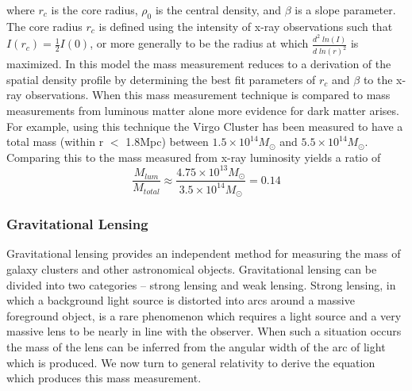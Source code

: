 \documentclass[a4paper,12pt]{article}
\begin{document}
where $r_c$ is the core radius, $\rho_0$ is the central density, and $\beta$ is a slope parameter.  \cite{Vikhlinin}  The core radius $r_c$ is defined using the intensity of x-ray observations such that $I(r_c)=\frac{1}{2}I(0)$, or more generally to be the radius at which $\frac{d^2 \; ln(I)}{d \; ln(r)^2}$ is maximized. In this model the mass measurement reduces to a derivation of the spatial density profile by determining the best fit parameters of $r_c$ and $\beta$ to the x-ray observations.  When this mass measurement technique is compared to mass measurements from luminous matter alone more evidence for dark matter arises. For example, using this technique the Virgo Cluster has been measured to have a total mass (within r $<$ 1.8Mpc) between $1.5 \times 10^{14} M_{\odot}$ and $5.5 \times10^{14} M_{\odot}$. \cite{Paradijs} Comparing this to the mass measured from x-ray luminosity yields a ratio of
\begin{equation} \label{betamodelmass}
\frac{M_{lum}}{M_{total}} \approx \frac{4.75 \times 10^{13} M_{\odot}}{3.5 \times 10^{14} M_{\odot}} = 0.14
\end{equation}

\subsubsection{Gravitational Lensing}


Gravitational lensing provides an independent method for measuring the mass of galaxy clusters and other astronomical objects.  Gravitational lensing can be divided into two categories -- strong lensing and weak lensing.  Strong lensing, in which a background light source is distorted into arcs around a massive foreground object, is a rare phenomenon which requires a light source and a very massive lens to be nearly in line with the observer.  When such a situation occurs the mass of the lens can be inferred from the angular width of the arc of light which is produced.  We now turn to general relativity to derive the equation which produces this mass measurement.
\end{document}
